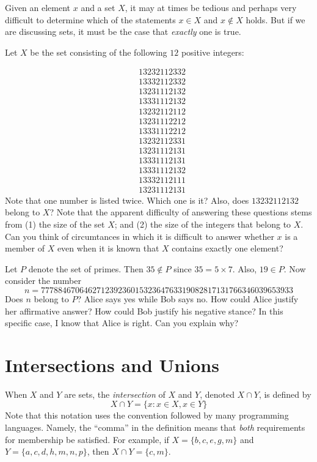 Given an element $x$ and a set $X$, it may at times be tedious and
perhaps very difficult to determine which of the statements
$x\in X$ and $x\notin X$ holds.  But if we are discussing sets,
it must be the case that \textit{exactly} one is true.

\begin{example}
Let $X$ be the set consisting of the following $12$ positive
integers:

\begin{align*}
&13232112332\\
&13332112332\\
&13231112132\\
&13331112132\\
&13232112112\\
&13231112212\\
&13331112212\\
&13232112331\\
&13231112131\\
&13331112131\\
&13331112132\\
&13332112111\\
&13231112131
\end{align*}
Note that one number is listed twice.  Which one is it?
Also, does $13232112132$ belong to $X$?  Note that the
apparent difficulty of answering these questions stems from
(1) the size of the set $X$; and (2) the size of the integers 
that belong to $X$.  Can you think of circumtances in which
it is difficult to answer whether $x$ is a member of $X$
even when it is known that $X$ contains exactly one element?
\end{example}

\begin{example}
Let $P$ denote the set of primes.  Then $35\notin P$ since
$35= 5\times 7$.  Also, $19\in P$.  Now consider the number
\[
n = 77788467064627123923601532364763319082817131766346039653933
\]
Does $n$ belong to $P$?  Alice says yes while Bob says no.
How could Alice justify her affirmative answer?  How could Bob
justify his negative stance?  In this specific case, I know that
Alice is right.  Can you explain why?
\end{example}

\section{Intersections and Unions}\label{s:background:int-union}

When $X$ and $Y$ are sets, the \textit{intersection}
of $X$ and $Y$, denoted $X\cap Y$, is defined by
\[
X\cap Y = \{x: x\in X, x\in Y\}
\]
Note that this notation uses the convention followed by
many programming languages. Namely, the ``comma'' in the
definition means that \textit{both} requirements for
membership be satisfied.  For example, if $X=\{b,c,e,g,m\}$
and $Y=\{a,c,d,h,m,n,p\}$, then $X\cap Y=\{c,m\}$.

